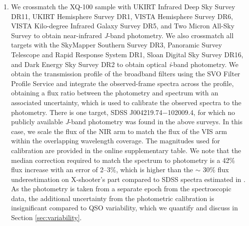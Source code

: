 \documentclass[fleqn,usenatbib]{mnras}
\begin{document}
\begin{enumerate}
    \item We crossmatch the XQ-100 sample with UKIRT Infrared Deep Sky Survey \citep[UKIDSS;][]{UKIDSS} DR11, UKIRT Hemisphere Survey \citep[UHS;][]{UHS_DR1} DR1, VISTA Hemisphere Survey \citep[VHS;][]{VHS} DR6, VISTA Kilo-degree Infrared Galaxy Survey \citep[VIKING;][]{VIKING} DR5, and Two Micron All-Sky Survey \citep[2MASS;][]{2MASS} to obtain near-infrared \textit{J}-band photometry. We also crossmatch all targets with the SkyMapper Southern Survey \citep[SMSS;][]{SMSS_2019} DR3, Panoramic Survey Telescope and Rapid Response System \citep[Pan-STARRS;][]{PanSTARRS} DR1, Sloan Digital Sky Survey \citep[SDSS;][]{York_2000_SDSS} DR16, and Dark Energy Sky Survey \citep[DES;][]{DES_2021} DR2 to obtain optical \textit{i}-band photometry. We obtain the transmission profile of the broadband filters using the SVO Filter Profile Service \citep{SVO_Filter_Profile_Service} and integrate the observed-frame spectra across the profile, obtaining a flux ratio between the photometry and spectrum with an associated uncertainty, which is used to calibrate the observed spectra to the photometry. There is one target, SDSS J004219.74$-$102009.4, for which no publicly available \textit{J}-band photometry was found in the above surveys. In this case, we scale the flux of the NIR arm to match the flux of the VIS arm within the overlapping wavelength coverage. The magnitudes used for calibration are provided in the online supplementary table. We note that the median correction required to match the spectrum to photometry is a 42\% flux increase with an error of 2--3\%, which is higher than the $\sim$ 30\% flux underestimation on X-shooter's part compared to SDSS spectra estimated in \citet{Lopez_2016_XQ100}. As the photometry is taken from a separate epoch from the spectroscopic data, the additional uncertainty from the photometric calibration is insignificant compared to QSO variability, which we quantify and discuss in Section \ref{sec:variability}.

\end{enumerate}
\end{document}
